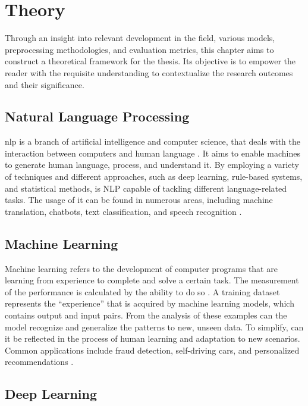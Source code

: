 \chapter{Theory}

Through an insight into relevant development in the field, various models, preprocessing methodologies, and evaluation metrics, this chapter aims to construct a theoretical framework for the thesis. Its objective is to empower the reader with the requisite understanding to contextualize the research outcomes and their significance.

\section{Natural Language Processing}

\acf{nlp} is a branch of artificial intelligence and computer science, that deals with the interaction between computers and human language \citep{helland_tackling_2023}. It aims to enable machines to generate human language, process, and understand it. By employing a variety of techniques and different approaches, such as deep learning, rule-based systems, and statistical methods, is NLP capable of tackling different language-related tasks. The usage of it can be found in numerous areas, including machine translation, chatbots, text classification, and speech recognition \citep{helland_tackling_2023}.

\section{Machine Learning}

Machine learning refers to the development of computer programs that are learning from experience to complete and solve a certain task. The measurement of the performance is calculated by the ability to do so \citep{helland_tackling_2023}. A training dataset represents the “experience” that is acquired by machine learning models, which contains output and input pairs. From the analysis of these examples can the model recognize and generalize the patterns to new, unseen data. To simplify, can it be reflected in the process of human learning and adaptation to new scenarios. Common applications include fraud detection, self-driving cars, and personalized recommendations \citep{helland_tackling_2023}.

\section{Deep Learning}

